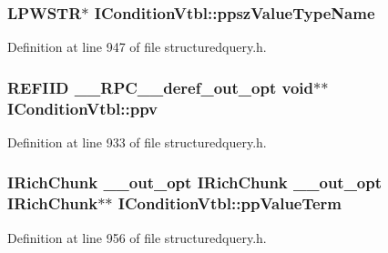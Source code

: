 \subsubsection[{\texorpdfstring{ppsz\+Value\+Type\+Name}{ppszValueTypeName}}]{ {\bf L\+P\+W\+S\+TR}$\ast$ I\+Condition\+Vtbl\+::ppsz\+Value\+Type\+Name}\hypertarget{struct_i_condition_vtbl_a46668b927fa60adeec8953aed3f538ff}{}\label{struct_i_condition_vtbl_a46668b927fa60adeec8953aed3f538ff}


Definition at line 947 of file structuredquery.\+h.

\subsubsection[{\texorpdfstring{ppv}{ppv}}]{ {\bf R\+E\+F\+I\+ID} {\bf \+\_\+\+\_\+\+R\+P\+C\+\_\+\+\_\+deref\+\_\+out\+\_\+opt} {\bf void}$\ast$$\ast$ I\+Condition\+Vtbl\+::ppv}\hypertarget{struct_i_condition_vtbl_a4dda978763f44cefbafcb2082c1eafb6}{}\label{struct_i_condition_vtbl_a4dda978763f44cefbafcb2082c1eafb6}


Definition at line 933 of file structuredquery.\+h.

\subsubsection[{\texorpdfstring{pp\+Value\+Term}{ppValueTerm}}]{ {\bf I\+Rich\+Chunk} {\bf \+\_\+\+\_\+out\+\_\+opt} {\bf I\+Rich\+Chunk} {\bf \+\_\+\+\_\+out\+\_\+opt} {\bf I\+Rich\+Chunk}$\ast$$\ast$ I\+Condition\+Vtbl\+::pp\+Value\+Term}\hypertarget{struct_i_condition_vtbl_a8b40b0610565df491a6da53aac2c93c7}{}\label{struct_i_condition_vtbl_a8b40b0610565df491a6da53aac2c93c7}


Definition at line 956 of file structuredquery.\+h.

